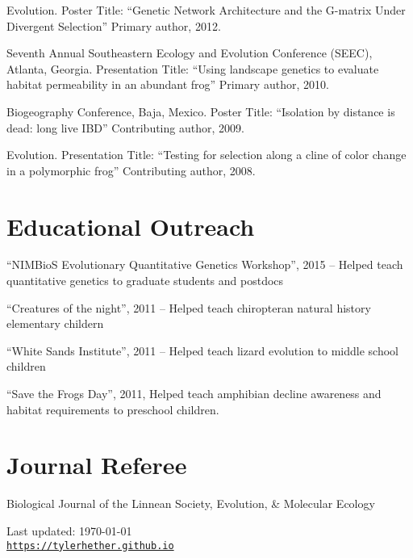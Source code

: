 \documentclass[letterpaper]{article}
\def\footerlink{https://tylerhether.github.io}
\renewenvironment{itemize}{
  \begin{list}{}{
    \setlength{\leftmargin}{1.5em}
  }
}{
  \end{list}
}
\begin{document}
\begin{itemize}
\item Evolution. Poster Title: ``Genetic Network Architecture and the G-matrix Under Divergent Selection'' Primary author, 2012.
\item Seventh Annual Southeastern Ecology and Evolution Conference (SEEC), Atlanta, Georgia. Presentation Title: ``Using landscape genetics to evaluate habitat permeability in an abundant frog'' Primary author, 2010.
\item Biogeography Conference, Baja, Mexico. Poster Title: ``Isolation by distance is dead: long live IBD'' Contributing author, 2009.
\item Evolution.  Presentation Title: ``Testing for selection along a cline of color change in a polymorphic frog'' Contributing author, 2008.
\end{itemize}

\section*{Educational Outreach}
\begin{itemize}
\item ``NIMBioS Evolutionary Quantitative Genetics Workshop'', 2015 -- Helped teach quantitative genetics to graduate students and postdocs
\item ``Creatures of the night'', 2011 -- Helped teach chiropteran natural history elementary childern
\item ``White Sands Institute'', 2011 -- Helped teach lizard evolution to middle school children
\item ``Save the Frogs Day'', 2011, Helped teach amphibian decline awareness and habitat requirements to preschool children.
\end{itemize}

\section*{Journal Referee}
\begin{itemize}
\item Biological Journal of the Linnean Society, Evolution, \& Molecular Ecology
\end{itemize}

\bigskip

\begin{center}
  \begin{footnotesize}
    Last updated: \today \\
    \href{\footerlink}{\texttt{\footerlink}}
  \end{footnotesize}
\end{center}
\end{document}
